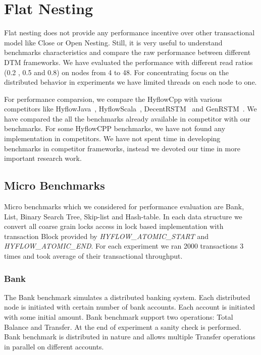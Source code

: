 \documentclass[12pt,english]{report}
\begin{document}
\section{Flat Nesting}

Flat nesting does not provide any performance incentive over other transactional model like Close or Open Nesting. Still, it is very useful to understand benchmarks characteristics and compare the raw performance between different DTM frameworks. We have evaluated the performance with different read ratios (0.2 , 0.5 and 0.8) on nodes from 4 to 48. For concentrating focus on the distributed behavior in experiments we have limited threads on each node to one.  

For performance comparsion, we compare the HyflowCpp with various competitors like HyflowJava~\cite{Saad:2011:HHP:1996130.1996167}, HyflowScala~\cite{turcuhyflow2}, DecentRSTM~\cite{DecentSTM:5470446} and GenRSTM~\cite{GenRSTM:6038614}. We have compared the all the benchmarks already available in competitor with our benchmarks. For some HyflowCPP benchmarks, we have not found any implementation in competitors. We have not spent time in developing benchmarks in competitor frameworks, instead we devoted our time in more important research work. 

\subsection{Micro Benchmarks}

Micro benchmarks which we considered for performance evaluation are Bank, List, Binary Search Tree, Skip-list and Hash-table. In each data structure we convert all coarse grain locks access in lock based implementation with transaction Block provided by \emph{HYFLOW{\_}ATOMIC{\_}START} and \emph{HYFLOW{\_}ATOMIC{\_}END}. For each experiment we ran 2000 transactions 3 times and took average of their transactional throughput.  

\subsubsection{Bank}

The Bank benchmark simulates a distributed banking system. Each distributed node is initiated with certain number of bank accounts. Each account is initiated with some initial amount. Bank benchmark support two operations: Total Balance and Transfer. At the end of experiment a sanity check is performed. Bank benchmark is distributed in nature and allows multiple Transfer operations in parallel on different accounts.
\end{document}
